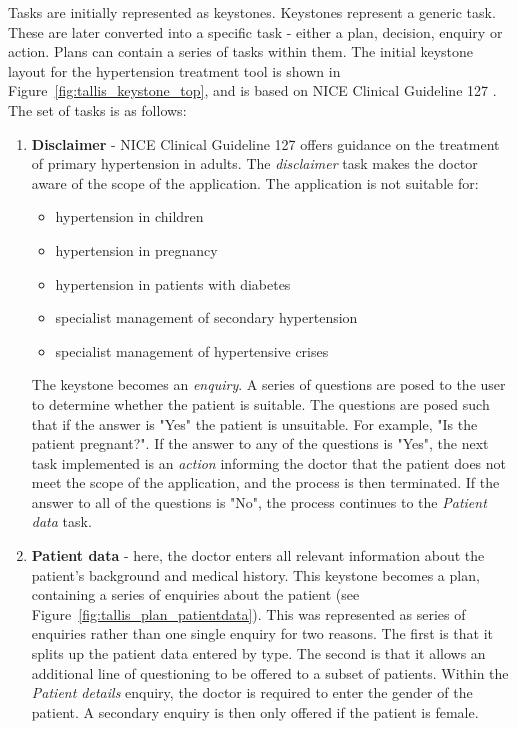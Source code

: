 \documentclass[11pt]{article}
\begin{document}
Tasks are initially represented as keystones. Keystones represent a generic task. These are later converted into a specific task - either a plan, decision, enquiry or action. Plans can contain a series of tasks within them. The initial keystone layout for the hypertension treatment tool is shown in Figure~\ref{fig:tallis_keystone_top}, and is based on NICE Clinical Guideline 127 \cite{CG127}. The set of tasks is as follows:
\begin{enumerate}
\item \textbf{Disclaimer} - NICE Clinical Guideline 127 offers guidance on the treatment of primary hypertension in adults. The \textit{disclaimer} task makes the doctor aware of the scope of the application. The application is not suitable for:
\begin{itemize}
	\item hypertension in children
	\item hypertension in pregnancy
	\item hypertension in patients with diabetes
	\item specialist management of secondary hypertension
	\item specialist management of hypertensive crises
\end{itemize}
The keystone becomes an \textit{enquiry}. A series of questions are posed to the user to determine whether the patient is suitable. The questions are posed such that if the answer is "Yes" the patient is unsuitable. For example, "Is the patient pregnant?". If the answer to any of the questions is "Yes", the next task implemented is an \textit{action} informing the doctor that the patient does not meet the scope of the application, and the process is then terminated. If the answer to all of the questions is "No", the process continues to the \textit{Patient data} task.

\item \textbf{Patient data} - here, the doctor enters all relevant information about the patient's background and medical history. This keystone becomes a plan, containing a series of enquiries about the patient (see Figure~\ref{fig:tallis_plan_patientdata}). This was represented as series of enquiries rather than one single enquiry for two reasons. The first is that it splits up the patient data entered by type. The second is that it allows an additional line of questioning to be offered to a subset of patients. Within the \textit{Patient details} enquiry, the doctor is required to enter the gender of the patient. A secondary enquiry is then only offered if the patient is female.


\end{enumerate}
\end{document}
